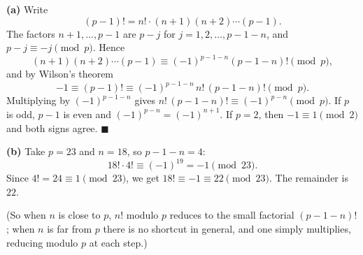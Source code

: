 \textbf{(a)} Write
\[(p-1)!=n!\cdot(n+1)(n+2)\cdots(p-1).\]
The factors $n+1,\dots,p-1$ are $p-j$ for $j=1,2,\dots,p-1-n$, and $p-j\equiv-j\pmod p$. Hence
\[(n+1)(n+2)\cdots(p-1)\equiv(-1)^{p-1-n}(p-1-n)!\pmod p,\]
and by Wilson's theorem
\[-1\equiv(p-1)!\equiv(-1)^{p-1-n}\,n!\,(p-1-n)!\pmod p .\]
Multiplying by $(-1)^{p-1-n}$ gives $n!\,(p-1-n)!\equiv(-1)^{p-n}\pmod p$. If $p$ is odd, $p-1$ is even and $(-1)^{p-n}=(-1)^{n+1}$. If $p=2$, then $-1\equiv1\pmod 2$ and both signs agree. $\blacksquare$

\textbf{(b)} Take $p=23$ and $n=18$, so $p-1-n=4$:
\[18!\cdot4!\equiv(-1)^{19}=-1\pmod{23}.\]
Since $4!=24\equiv1\pmod{23}$, we get $18!\equiv-1\equiv22\pmod{23}$. The remainder is $\boxed{22}$.

(So when $n$ is close to $p$, $n!$ modulo $p$ reduces to the small factorial $(p-1-n)!$; when $n$ is far from $p$ there is no shortcut in general, and one simply multiplies, reducing modulo $p$ at each step.)
